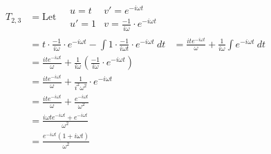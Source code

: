 \documentclass[preview]{standalone}
\begin{document}
\begin{align*}
T_{2,3}&= \textrm{Let} \quad \begin{array}{rl}u=t & v'=e^{-i\omega t} \\ u'=1 & v=\frac{-1}{i\omega}\cdot e^{-i\omega t} \end{array} \\ &=t\cdot \frac{-1}{i\omega}\cdot e^{-i\omega t}-\int 1\cdot \frac{-1}{i\omega t}\cdot e^{-i\omega t} \ dt &=\frac{ite^{-i\omega t}}{\omega}+\frac{1}{i\omega}\int e^{-i\omega t} \ dt \\ &=\frac{ite^{-i\omega t}}{\omega}+\frac{1}{i\omega}\left(\frac{-1}{i\omega}\cdot e^{-i\omega t}\right) \\ &=\frac{ite^{-i\omega t}}{\omega}+\frac{1}{i^{2}\omega^{2}}\cdot e^{-i\omega t} \\ &=\frac{ite^{-i\omega t}}{\omega}+\frac{e^{-i\omega t}}{\omega^{2}} \\ &=\frac{i\omega t e^{-i\omega t}+e^{-i\omega t}}{\omega^{2}} \\ &=\frac{e^{-i\omega t}(1+i\omega t)}{\omega^{2}}
\end{align*}
\end{document}
